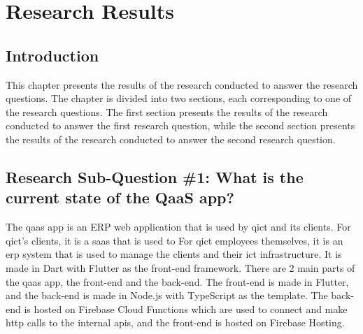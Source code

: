 \chapter{Research Results}
\begin{multicols}{2}
      \section{Introduction}
      This chapter presents the results of the research conducted to answer the research questions. The chapter is
      divided into two sections, each corresponding to one of the research questions. The first section presents
      the results of the research conducted to answer the first research question, while the second section
      presents the results of the research conducted to answer the second research question.

      \section{Research Sub-Question \#1: What is the current state of the QaaS app?}

      The \acrshort{qaas} app is an \gls{ERP} web application that is used by \acrshort{qict} and its clients.
      For \acrshort{qict}'s clients, it is a \acrshort{saas} that is used to
      For \acrshort{qict} employees themselves, it is an \acrshort{erp} system that is used to manage the clients and their
      \acrshort{ict} infrastructure. It is made in Dart with Flutter as the front-end framework. There are 2 main parts of the
      \acrshort{qaas} app, the front-end and the back-end. The front-end is made in Flutter, and the back-end is made in Node.js with
      TypeScript as the template. The back-end is hosted on Firebase Cloud Functions which are used to connect and make \acrshort{http}
      calls to the internal \acrshort{api}s, and the front-end is hosted on Firebase Hosting.


\end{multicols}
